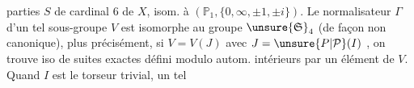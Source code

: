 parties $S$ de cardinal 6 de $X$, isom. à $(\mathbb P_1,\{0,\infty,\pm1,\pm i\})$.
Le normalisateur $\Gamma$ d'un tel  sous-groupe $V$  est isomorphe
au groupe  $\unsure{\mathfrak S}_4$ (de façon non canonique), plus
précisément, si $V=V(J)$ avec $J=\unsure{P|\mathcal P}(I)$ , on trouve  iso
de suites exactes
défini modulo autom. intérieurs par un élément de $V$.
Quand $I$ est le torseur trivial,  un tel 
